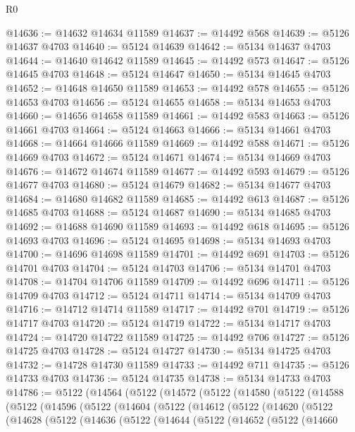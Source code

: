 \begin{lexlean}{R0}
\begin{coremodule}
@14636 := @14632 @14634 @11589
@14637 := @14492 @568
@14639 := @5126 @14637 @4703
@14640 := @5124 @14639
@14642 := @5134 @14637 @4703
@14644 := @14640 @14642 @11589
@14645 := @14492 @573
@14647 := @5126 @14645 @4703
@14648 := @5124 @14647
@14650 := @5134 @14645 @4703
@14652 := @14648 @14650 @11589
@14653 := @14492 @578
@14655 := @5126 @14653 @4703
@14656 := @5124 @14655
@14658 := @5134 @14653 @4703
@14660 := @14656 @14658 @11589
@14661 := @14492 @583
@14663 := @5126 @14661 @4703
@14664 := @5124 @14663
@14666 := @5134 @14661 @4703
@14668 := @14664 @14666 @11589
@14669 := @14492 @588
@14671 := @5126 @14669 @4703
@14672 := @5124 @14671
@14674 := @5134 @14669 @4703
@14676 := @14672 @14674 @11589
@14677 := @14492 @593
@14679 := @5126 @14677 @4703
@14680 := @5124 @14679
@14682 := @5134 @14677 @4703
@14684 := @14680 @14682 @11589
@14685 := @14492 @613
@14687 := @5126 @14685 @4703
@14688 := @5124 @14687
@14690 := @5134 @14685 @4703
@14692 := @14688 @14690 @11589
@14693 := @14492 @618
@14695 := @5126 @14693 @4703
@14696 := @5124 @14695
@14698 := @5134 @14693 @4703
@14700 := @14696 @14698 @11589
@14701 := @14492 @691
@14703 := @5126 @14701 @4703
@14704 := @5124 @14703
@14706 := @5134 @14701 @4703
@14708 := @14704 @14706 @11589
@14709 := @14492 @696
@14711 := @5126 @14709 @4703
@14712 := @5124 @14711
@14714 := @5134 @14709 @4703
@14716 := @14712 @14714 @11589
@14717 := @14492 @701
@14719 := @5126 @14717 @4703
@14720 := @5124 @14719
@14722 := @5134 @14717 @4703
@14724 := @14720 @14722 @11589
@14725 := @14492 @706
@14727 := @5126 @14725 @4703
@14728 := @5124 @14727
@14730 := @5134 @14725 @4703
@14732 := @14728 @14730 @11589
@14733 := @14492 @711
@14735 := @5126 @14733 @4703
@14736 := @5124 @14735
@14738 := @5134 @14733 @4703
@14786 := @5122
    (@14564
      (@5122
        (@14572
          (@5122
            (@14580
              (@5122
                (@14588
                  (@5122
                    (@14596
                      (@5122
                        (@14604
                          (@5122
                            (@14612
                              (@5122
                                (@14620
                                  (@5122
                                    (@14628
                                      (@5122
                                        (@14636
                                          (@5122
                                            (@14644
                                              (@5122
                                                (@14652
                                                  (@5122
                                                    (@14660

\end{coremodule}
\end{lexlean}
